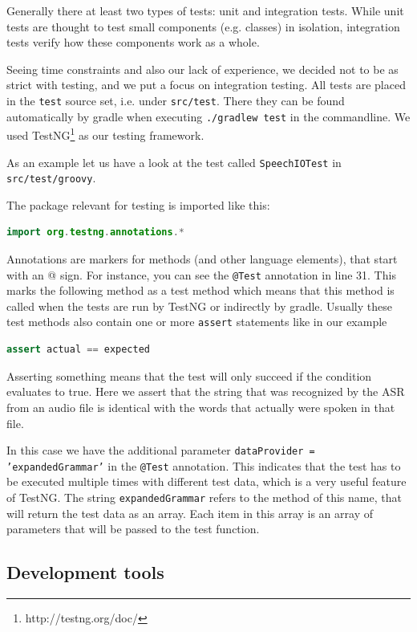 \documentclass[a4paper, 12pt]{article}
\begin{document}
Generally there at least two types of tests: unit and integration tests.
While unit tests are thought to test small components (e.g. classes) in isolation, integration tests verify how these components work as a whole.

Seeing time constraints and also our lack of experience, we decided not to be as strict with testing, and we put a focus on integration testing.
All tests are placed in the \texttt{test} source set, i.e. under \texttt{src/test}.
There they can be found automatically by gradle when executing \texttt{./gradlew test} in the commandline.
We used TestNG\footnote{http://testng.org/doc/} as our testing framework.

As an example let us have a look at the test called \texttt{SpeechIOTest} in \texttt{src/test/groovy}.

The package relevant for testing is imported like this:
\begin{lstlisting}[language=java]
import org.testng.annotations.*
\end{lstlisting}
Annotations are markers for methods (and other language elements), that start with an @ sign.
For instance, you can see the \texttt{@Test} annotation in line 31.
This marks the following method as a test method which means that this method is called when the tests are run by TestNG or indirectly by gradle.
Usually these test methods also contain one or more \texttt{assert} statements like in our example
\begin{lstlisting}[language=java]
assert actual == expected
\end{lstlisting}
Asserting something means that the test will only succeed if the condition evaluates to true.
Here we assert that the string that was recognized by the ASR from an audio file is identical with the words that actually were spoken in that file.

In this case we have the additional parameter \texttt{dataProvider = 'expandedGrammar'} in the \texttt{@Test} annotation.
This indicates that the test has to be executed multiple times with different test data, which is a very useful feature of TestNG.
The string \texttt{expandedGrammar} refers to the method of this name, that will return the test data as an array.
Each item in this array is an array of parameters that will be passed to the test function.


\subsection{Development tools}
\end{document}
